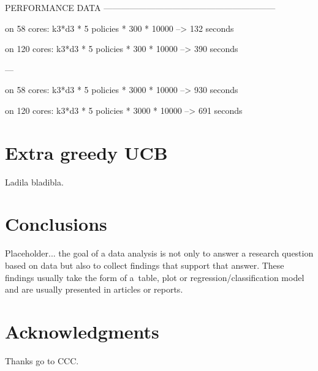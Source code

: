 \documentclass[nojss]{jss}\usepackage[]{graphicx}\usepackage[]{color}
\begin{document}
PERFORMANCE DATA  ------------------------------------------------------------

on 58  cores:    k3*d3 * 5 policies * 300  * 10000 --\textgreater{} 132 seconds

on 120 cores:    k3*d3 * 5 policies * 300  * 10000 --\textgreater{} 390 seconds

---

on 58  cores:    k3*d3 * 5 policies * 3000 * 10000 --\textgreater{} 930 seconds

on 120 cores:    k3*d3 * 5 policies * 3000 * 10000 --\textgreater{} 691 seconds



\section{Extra greedy UCB}

Ladila bladibla.

\section{Conclusions}
\label{sec:conc4}


Placeholder... the goal of a data analysis is not only to answer a research question based on data but also to collect findings that support that answer. These findings usually take the form of a~table, plot or regression/classification model and are usually presented in articles or reports.

\section{Acknowledgments}

Thanks go to CCC.

%

\end{document}
